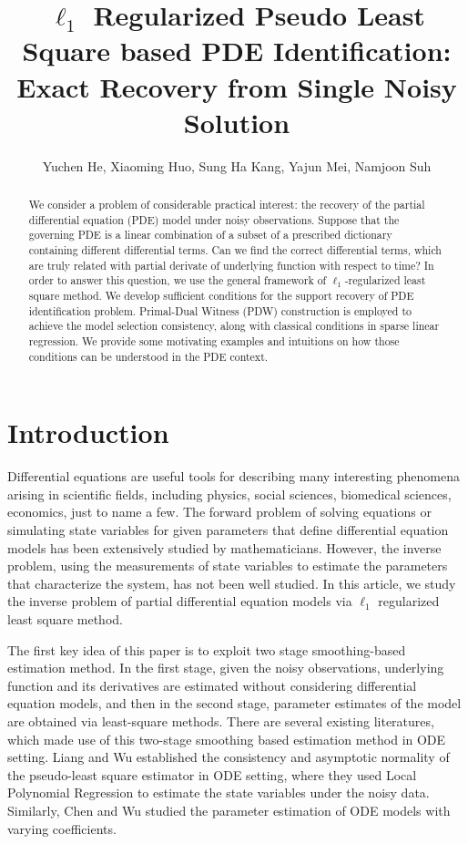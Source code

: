 \documentclass[a4paper,11pt]{article}
\begin{document}
\title{$\ell_1$ Regularized Pseudo Least Square based PDE Identification: Exact Recovery from Single Noisy Solution }
\author{Yuchen He, Xiaoming Huo, Sung Ha Kang, Yajun Mei, Namjoon Suh}
\maketitle
\begin{abstract}
We consider a problem of considerable practical interest: the recovery of the partial differential equation (PDE) model under noisy observations. Suppose that the governing PDE is a linear combination of a subset of a prescribed dictionary containing different differential terms. Can we find the correct differential terms, which are truly related with partial derivate of underlying function with respect to time? In order to answer this question, we use the general framework of $\ell_{1}$-regularized least square method. We develop sufficient conditions for the support recovery of PDE identification problem. Primal-Dual Witness (PDW) construction is employed to achieve the model selection consistency, along with classical conditions in sparse linear regression. We provide some motivating examples and intuitions on how those conditions can be understood in the PDE context.
\end{abstract}
\section{Introduction}

Differential equations are useful tools for describing many interesting phenomena arising in scientific fields, including physics, social sciences, biomedical sciences, economics, just to name a few. The forward problem of solving equations or simulating state variables for given parameters that define differential equation models has been extensively studied by mathematicians. However, the inverse problem, using the measurements of state variables to estimate the parameters that characterize the system, has not been well studied. In this article, we study the inverse problem of partial differential equation models via $\ell_{1}$ regularized least square method.

The first key idea of this paper is to exploit two stage smoothing-based estimation method. In the first stage, given the noisy observations, underlying function and its derivatives are estimated without considering differential equation models, and then in the second stage, parameter estimates of the model are obtained via least-square methods. There are several existing literatures, which made use of this two-stage smoothing based estimation method in ODE setting. Liang and Wu \cite{liang2008parameter} established the consistency and asymptotic normality of the pseudo-least square estimator in ODE setting, where they used Local Polynomial Regression to estimate the state variables under the noisy data. Similarly, Chen and Wu \cite{chen2008efficient,chen2008estimation} studied the parameter estimation of ODE models with varying coefficients.
\end{document}
